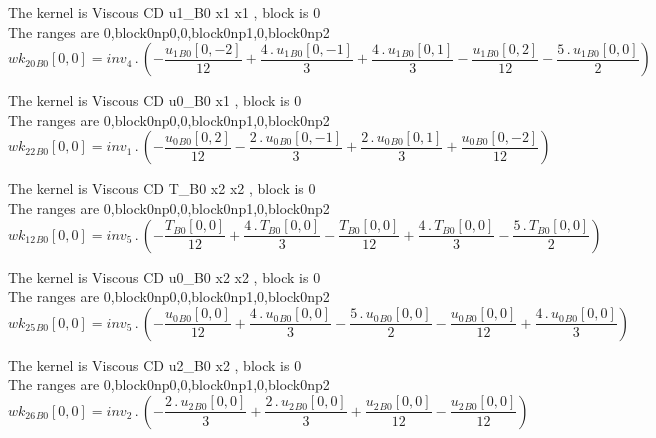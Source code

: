 \documentclass{article}
\begin{document}
\noindent The kernel is Viscous CD u1_B0 x1 x1 , block is 0\\\noindent The ranges are 0,block0np0,0,block0np1,0,block0np2\\\begin{dmath}{wk_{20}{_{B0}}}[{0,0}] = inv_4 \,.\, \left(- \frac{{u_{1}{_{B0}}}[{0,-2}]}{12} + \frac{4 \,.\, {u_{1}{_{B0}}}[{0,-1}]}{3} + \frac{4 \,.\, {u_{1}{_{B0}}}[{0,1}]}{3} - \frac{{u_{1}{_{B0}}}[{0,2}]}{12} - \frac{5 \,.\, 
{u_{1}{_{B0}}}[{0,0}]}{2}\right)\end{dmath}

\noindent The kernel is Viscous CD u0_B0 x1 , block is 0\\\noindent The ranges are 0,block0np0,0,block0np1,0,block0np2\\\begin{dmath}{wk_{22}{_{B0}}}[{0,0}] = inv_1 \,.\, \left(- \frac{{u_{0}{_{B0}}}[{0,2}]}{12} - \frac{2 \,.\, {u_{0}{_{B0}}}[{0,-1}]}{3} + \frac{2 \,.\, {u_{0}{_{B0}}}[{0,1}]}{3} + \frac{{u_{0}{_{B0}}}[{0,-2}]}{12}\right)\end{dmath}

\noindent The kernel is Viscous CD T_B0 x2 x2 , block is 0\\\noindent The ranges are 0,block0np0,0,block0np1,0,block0np2\\\begin{dmath}{wk_{12}{_{B0}}}[{0,0}] = inv_5 \,.\, \left(- \frac{{T{_{B0}}}[{0,0}]}{12} + \frac{4 \,.\, {T{_{B0}}}[{0,0}]}{3} - \frac{{T{_{B0}}}[{0,0}]}{12} + \frac{4 \,.\, {T{_{B0}}}[{0,0}]}{3} - \frac{5 \,.\, {T{_{B0}}}[{0,0}]}{2}\right)\end{dmath}

\noindent The kernel is Viscous CD u0_B0 x2 x2 , block is 0\\\noindent The ranges are 0,block0np0,0,block0np1,0,block0np2\\\begin{dmath}{wk_{25}{_{B0}}}[{0,0}] = inv_5 \,.\, \left(- \frac{{u_{0}{_{B0}}}[{0,0}]}{12} + \frac{4 \,.\, {u_{0}{_{B0}}}[{0,0}]}{3} - \frac{5 \,.\, {u_{0}{_{B0}}}[{0,0}]}{2} - \frac{{u_{0}{_{B0}}}[{0,0}]}{12} + \frac{4 \,.\, 
{u_{0}{_{B0}}}[{0,0}]}{3}\right)\end{dmath}

\noindent The kernel is Viscous CD u2_B0 x2 , block is 0\\\noindent The ranges are 0,block0np0,0,block0np1,0,block0np2\\\begin{dmath}{wk_{26}{_{B0}}}[{0,0}] = inv_2 \,.\, \left(- \frac{2 \,.\, {u_{2}{_{B0}}}[{0,0}]}{3} + \frac{2 \,.\, {u_{2}{_{B0}}}[{0,0}]}{3} + \frac{{u_{2}{_{B0}}}[{0,0}]}{12} - \frac{{u_{2}{_{B0}}}[{0,0}]}{12}\right)\end{dmath}
\end{document}
